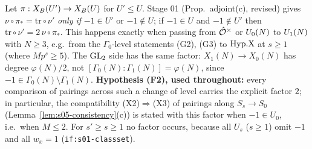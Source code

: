 \begin{remark}\label{rem:s05-factor2}
Let $\pi:X_B(U')\to X_B(U)$ for $U'\le U$. Stage 01 (Prop.~adjoint(c), revised) gives
$\nu\circ\pi_*=\mathrm{tr}\circ\nu'$ \emph{only if} $-1\in U'$ or $-1\notin U$; if $-1\in U$ and $-1\notin U'$ then
$\mathrm{tr}\circ\nu'=2\,\nu\circ\pi_*$. This happens exactly when passing from $\hat{\mathcal{O}}^\times$ or $U_0(N)$ to $U_1(N)$ with
$N\ge3$, e.g.\ from the $\Gamma_0$-level statements (G2), (G3) to $\mathrm{Hyp.X}$ at $s\ge1$ (where $Mp^s\ge5$). The $\mathrm{GL}_2$ side has the
same factor: $X_1(N)\to X_0(N)$ has degree $\varphi(N)/2$, not $[\Gamma_0(N):\Gamma_1(N)]=\varphi(N)$, since
$-1\in\Gamma_0(N)\setminus\Gamma_1(N)$. \textbf{Hypothesis (F2), used throughout:} every comparison of pairings across such a
change of level carries the explicit factor $2$; in particular, the compatibility (X2)$\Rightarrow$(X3) of pairings along
$S_{s}\to S_0$ (Lemma~\ref{lem:s05-consistency}(c)) is stated with this factor when $-1\in U_0$, i.e.\ when $M\le2$. For $s'\ge s\ge1$
no factor occurs, because all $U_s$ ($s\ge1$) omit $-1$ and all $w_x=1$ (\texttt{if:s01-classset}).
\end{remark}

